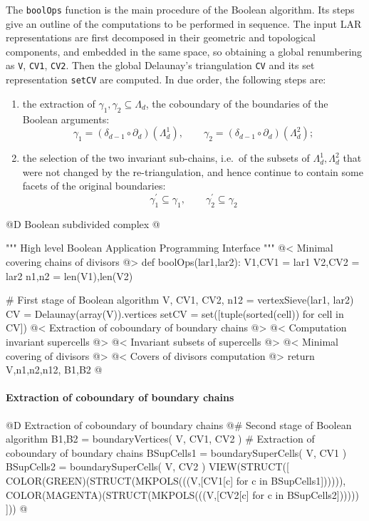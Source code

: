 \documentclass[11pt,oneside]{article}	%
\begin{document}
The \texttt{boolOps} function is the main procedure of the Boolean algorithm.
Its steps give an outline of the computations to be performed in sequence. The input LAR representations are first decomposed in their geometric and topological components, and embedded in the same space, so obtaining a global renumbering as \texttt{V}, \texttt{CV1}, \texttt{CV2}. Then the global Delaunay's triangulation \texttt{CV} and its set representation \texttt{setCV} are computed. In due order, the following steps are:  
\begin{enumerate}
\item 
the extraction of $\gamma_1,\gamma_2\subseteq\Lambda_d$, the coboundary of the boundaries of the Boolean arguments:
\[
\gamma_1 = (\delta_{d-1}\circ\partial_d) (\Lambda_d^1), \qquad
\gamma_2 = (\delta_{d-1}\circ\partial_d) (\Lambda_d^2);
\]  
\item 
the selection of the two invariant sub-chains, i.e.~of the subsets of $\Lambda_d^1, \Lambda_d^2$ that were not changed by the re-triangulation, and hence continue to contain some facets of the original boundaries:
\[
\gamma^{'}_1 \subseteq \gamma_1, \qquad
\gamma^{'}_2 \subseteq \gamma_2
\]
\end{enumerate}


@D Boolean subdivided complex
@{""" High level Boolean Application Programming Interface """
@< Minimal covering chains of divisors @>
def boolOps(lar1,lar2):
	V1,CV1 = lar1
	V2,CV2 = lar2
	n1,n2 = len(V1),len(V2)
	
	# First stage of Boolean algorithm
	V, CV1, CV2, n12 = vertexSieve(lar1, lar2)
	CV = Delaunay(array(V)).vertices
	setCV = set([tuple(sorted(cell)) for cell in CV])
	@< Extraction of coboundary of boundary chains @>
	@< Computation invariant supercells @>
	@< Invariant subsets of supercells @>
	@< Minimal covering of divisors @>
	@< Covers of divisors computation @>
	return V,n1,n2,n12, B1,B2
@}

\paragraph{Extraction of coboundary of boundary chains}
@D Extraction of coboundary of boundary chains
@{# Second stage of Boolean algorithm
B1,B2 = boundaryVertices( V, CV1, CV2 )
# Extraction of coboundary of boundary chains
BSupCells1 = boundarySuperCells( V, CV1 )
BSupCells2 = boundarySuperCells( V, CV2 )
VIEW(STRUCT([ 
	COLOR(GREEN)(STRUCT(MKPOLS(((V,[CV1[c] for c in BSupCells1]))))), 
	COLOR(MAGENTA)(STRUCT(MKPOLS(((V,[CV2[c] for c in BSupCells2]))))) 
])) 
@}
\end{document}
